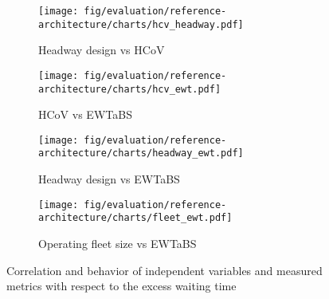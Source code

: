 \begin{figure}[h]
	\centering
	\begin{subfigure}[b]{0.49\textwidth}
		\centering
		\texttt{[image: fig/evaluation/reference-architecture/charts/hcv\_headway.pdf]}
		\caption{Headway design vs \gls{HCoV}}
		\label{fig:evaluation--suts-results-hcv-headway}
	\end{subfigure}
	\begin{subfigure}[b]{0.49\textwidth}
		\centering
		\texttt{[image: fig/evaluation/reference-architecture/charts/hcv\_ewt.pdf]}
		\caption{HCoV vs \gls{EWTaBS}}
		\label{fig:evaluation--suts-results-hcv-ewt}
	\end{subfigure}
	\begin{subfigure}[b]{0.49\textwidth}
		\centering
		\texttt{[image: fig/evaluation/reference-architecture/charts/headway\_ewt.pdf]}
		\caption{Headway design vs \gls{EWTaBS}}
		\label{fig:evaluation--suts-results-headway-ewt}
	\end{subfigure}
	\begin{subfigure}[b]{0.49\textwidth}
		\centering
		\texttt{[image: fig/evaluation/reference-architecture/charts/fleet\_ewt.pdf]}
		\caption{Operating fleet size vs \gls{EWTaBS}}
		\label{fig:evaluation--suts-results-fleet-ewt}
	\end{subfigure}
	\caption{Correlation and behavior of independent variables and measured metrics with respect to the excess waiting time}
	\label{fig:evaluation--suts-results-correlation-variables}
\end{figure}

